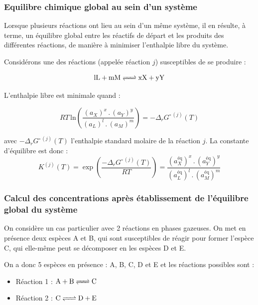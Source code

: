 \documentclass[fr]{../../../eplsummary}
\begin{document}
\subsubsection{Equilibre chimique global au sein d’un système}


\par Lorsque plusieurs réactions ont lieu au sein d’un même système, il en résulte, à terme, un équilibre global entre les réactifs de départ et les produits des différentes réactions, de manière à minimiser l’enthalpie libre du système.\\
\par Considérons une des réactions (appelée réaction $j$) susceptibles de se produire :

$$\ce{lL + mM <=> xX + yY}$$

\par L'enthalpie libre est minimale quand : 

$$RT \, \mathrm{ln}(\frac{(a_{X})^{x} \, . \, (a_{Y})^{y}  }{(a_{L})^{l} \, . \, (a_{M})^{m}}) = - \Delta_{r}G^{\circ \, (j)}(T)$$

\par avec $- \Delta_{r}G^{\circ \, (j)}(T)$ l'enthalpie standard molaire de la réaction $j$. La constante d'équilibre est donc : 
$$K^{(j)}(T) = \exp(\frac{- \Delta_{r}G^{\circ \, (j)}(T)}{RT})=\frac{(a_{X}^{\mbox{éq}})^{x} \, . \, (a_{Y}^{\mbox{éq}})^{y}  }{(a_{L}^{\mbox{éq}})^{l} \, . \, (a_{M}^{\mbox{éq}})^{m}}$$


\subsubsection{Calcul des concentrations après établissement de l’équilibre global du système}

\par On considère un cas particulier avec 2 réactions en phases gazeuses. On met en présence deux espèces A et B, qui sont susceptibles de réagir pour former l’espèce C, qui elle-même peut se décomposer en les espèces D et E.

\par On a donc 5 espèces en présence : A, B, C, D et E et les réactions possibles sont : 

\begin{itemize}
\item Réaction 1 : $\ce{A + B <=> C}$
\item Réaction 2 : $\ce{C <=> D + E}$
\end{itemize}
\end{document}
